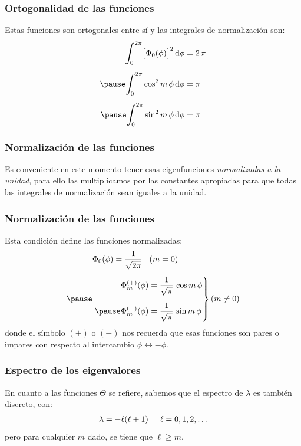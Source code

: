 \documentclass[12pt]{beamer}
\begin{document}
\begin{frame}
\frametitle{Ortogonalidad de las funciones}
Estas funciones son ortogonales entre sí y las integrales de normalización son:
\pause
\begin{eqnarray*}
\begin{aligned}
\scaleint{6ex}_{\bs 0}^{2 \pi} \big[ \Phi_{0} (\phi) \big]^{2} \dd{\phi} &= 2 \, \pi \\[0.5em] \pause
\scaleint{6ex}_{\bs 0}^{2 \pi} \cos^{2} m \, \phi \dd{\phi} &= \pi \\[0.5em] \pause
\scaleint{6ex}_{\bs 0}^{2 \pi} \sin^{2} m \, \phi \dd{\phi} &= \pi
\end{aligned}
\end{eqnarray*}
\end{frame}
\begin{frame}
\frametitle{Normalización de las funciones}
Es conveniente en este momento tener esas eigenfunciones \emph{normalizadas a la unidad}, \pause para ello las multiplicamos por las constantes apropiadas para que todas las integrales de normalización sean iguales a la unidad.
\end{frame}
\begin{frame}
\frametitle{Normalización de las funciones}
Esta condición define las funciones normalizadas:
\pause
\begin{eqnarray*}
\begin{aligned}
&\Phi_{0} (\phi) = \dfrac{1}{\sqrt{2 \pi}} \hspace{0.3cm} (m = 0) \\[0.5em] \pause
&\left. \begin{aligned}
\Phi_{m}^{(+)} (\phi) &= \dfrac{1}{\sqrt{\pi}} \, \cos m \, \phi \\[0.5em] \pause
\Phi_{m}^{(-)} (\phi) &= \dfrac{1}{\sqrt{\pi}} \, \sin m \, \phi
\end{aligned} \right\}
(m \neq 0)
\end{aligned}
\end{eqnarray*}
\pause
donde el símbolo $(+)$ o $(-)$ nos recuerda que esas funciones son pares o impares con respecto al intercambio $\phi \leftrightarrow - \phi$.
\end{frame}
\begin{frame}
\frametitle{Espectro de los eigenvalores}
En cuanto a las funciones $\Theta$ se refiere, \pause sabemos que el espectro de $\lambda$ es también discreto, con:
\pause
\begin{align*}
\lambda = - \ell (\ell + 1) \hspace{0.5cm} \ell = 0, 1, 2, \ldots
\end{align*}
pero para cualquier $m$ dado, se tiene que $\ell \geq m$.
\end{frame}
\end{document}
